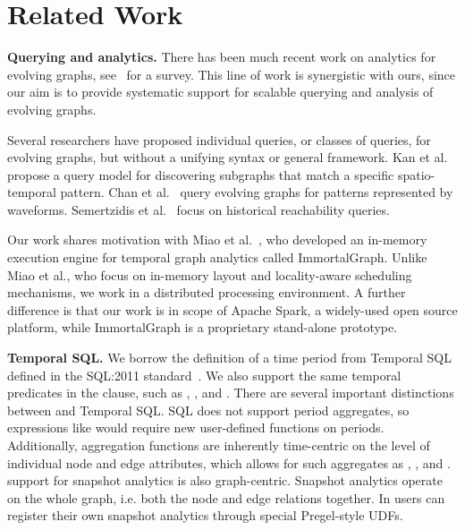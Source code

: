 \section{Related Work}
\label{sec:related}

{\bf Querying and analytics.} There has been much recent work on
analytics for evolving graphs,
see~\cite{DBLP:journals/csur/AggarwalS14} for a survey. This line of
work is synergistic with ours, since our aim is to provide systematic
support for scalable querying and analysis of evolving graphs.

Several researchers have proposed individual queries, or classes of
queries, for evolving graphs, but without a unifying syntax or general
framework.  Kan et al.~\cite{Kan2009} propose a query model for
discovering subgraphs that match a specific spatio-temporal pattern.
Chan et al.~\cite{Chan2008} query evolving graphs for patterns
represented by waveforms.  Semertzidis et al.~\cite{Semertzidis2015}
focus on historical reachability queries.

Our work shares motivation with Miao et
al.~\cite{DBLP:journals/tos/MiaoHLWYZPCC15}, who developed an
in-memory execution engine for temporal graph analytics called
ImmortalGraph.  Unlike Miao et al., who focus on in-memory layout and
locality-aware scheduling mechanisms, we work in a distributed
processing environment.  A further difference is that our work is in
scope of Apache Spark, a widely-used open source platform, while
ImmortalGraph is a proprietary stand-alone prototype.


{\bf Temporal SQL.}  We borrow the definition of a time period from
Temporal SQL defined in the SQL:2011
standard~\cite{DBLP:journals/sigmod/KulkarniM12}.  We also support the
same temporal predicates in the  clause, such as
, , and .  There are
several important distinctions between \ql and Temporal SQL.  SQL does
not support period aggregates, so expressions like  would require new user-defined functions on
periods. Additionally, \ql aggregation functions are inherently
time-centric on the level of individual node and edge attributes,
which allows for such aggregates as , , and
.  \ql support for snapshot analytics is also
graph-centric.  Snapshot analytics operate on the whole graph,
i.e. both the node and edge relations together.  In \ql users can
register their own snapshot analytics through special Pregel-style
UDFs.

